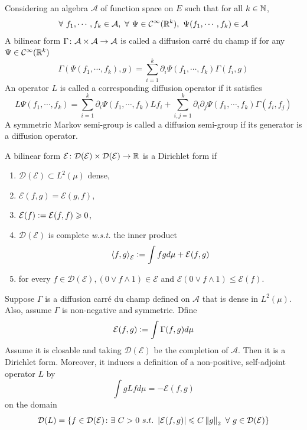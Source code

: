 \documentclass[a4paper,12pt]{article}
\begin{document}
\begin{itemize}
  \noindent Considering an algebra $\mathcal{A}$ of function space on $E$ such that for all $k \in \mathbb{N}$,
  \begin{equation*}
    \forall~f_1,\cdots,f_k \in \mathcal{A},~\forall~\Psi \in \mathcal{C}^\infty(\mathbb{R}^k),~\Psi(f_1,\cdots,f_k)\in \mathcal{A}
  \end{equation*}
  A bilinear form $\Gamma \colon \mathcal{A} \times \mathcal{A} \rightarrow \mathcal{A}$ is called a diffusion carr\'e du champ if for any $\Psi \in \mathcal{C}^\infty(\mathbb{R}^k)$
  \begin{equation*}
    \Gamma(\Psi(f_1,\cdots,f_k),g) = \sum_{i=1}^k\partial_i\Psi(f_1,\cdots,f_k)\Gamma(f_i,g)
  \end{equation*}
  An operator $L$ is called a corresponding diffusion operator if it satisfies
  \begin{equation*}
    L\Psi(f_1,\cdots,f_k) = \sum_{i=1}^k\partial_i \Psi(f_1,\cdots,f_k)Lf_i + \sum_{i,j=1}^k\partial_i\partial_j\Psi(f_1,\cdots,f_k)\Gamma(f_i,f_j)
  \end{equation*}
  A symmetric Markov semi-group is called a diffusion semi-group if its generator is a diffusion operator. 

  \noindent A bilinear form $\mathcal{E} \colon \mathcal{D}(\mathcal{E}) \times \mathcal{D}(\mathcal{E}) \rightarrow \mathbb{R}$ is a Dirichlet form if
  \begin{enumerate}[label=(\roman*)]
    \item $\mathcal{D}(\mathcal{E}) \subset L^2(\mu)$ dense,
    \item $\mathcal{E}(f,g) = \mathcal{E}(g,f)$,
    \item $\mathcal{E}(f) \vcentcolon= \mathcal{E}(f,f) \geqslant 0$,
    \item $\mathcal{D}(\mathcal{E})$ is complete \emph{w.s.t.} the inner product
    \begin{equation*}
      \left\langle f,g \right\rangle_{\mathcal{E}} \vcentcolon= \int fg d\mu + \mathcal{E}(f,g)
    \end{equation*}
    \item for every $f \in \mathcal{D}(\mathcal{E}),(0 \vee f \wedge 1) \in \mathcal{E}$ and $\mathcal{E}(0 \vee f \wedge 1) \leq \mathcal{E}(f)$.
  \end{enumerate}

  \noindent Suppose $\Gamma$ is a diffusion carr\'e du champ defined on $\mathcal{A}$ that is dense in $L^2(\mu)$. Also, assume $\Gamma$ is non-negative and symmetric. Dfine
  \begin{equation*}
    \mathcal{E}(f,g) \vcentcolon= \int \Gamma(f,g) d\mu
  \end{equation*}
  Assume it is closable and taking $\mathcal{D}(\mathcal{E})$ be the completion of $\mathcal{A}$. Then it is a Dirichlet form. Moreover, it induces a definition of a non-positive, self-adjoint operator $L$ by
  \begin{equation*}
    \int gLf d\mu = -\mathcal{E}(f,g)
  \end{equation*}
  on the domain
  \begin{equation*}
    \mathcal{D}(L) =\left\{f \in \mathcal{D}(\mathcal{E}) \colon \exists~C>0~s.t.~\left\lvert\mathcal{E}(f,g)\right\lvert \leqslant C\left\lVert g\right\lVert_2~\forall~g\in \mathcal{D}(\mathcal{E})\right\}
  \end{equation*}


\end{itemize}
\end{document}
